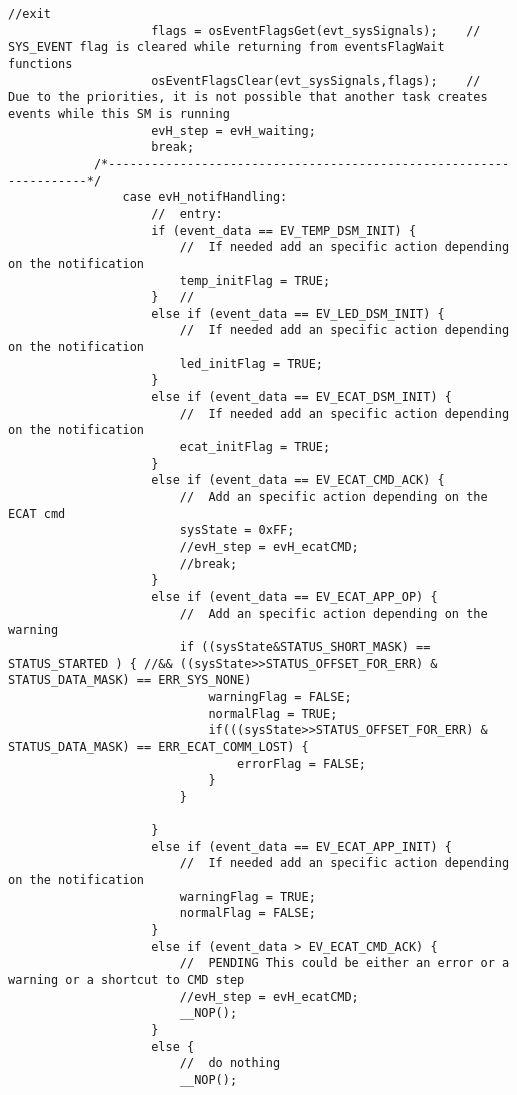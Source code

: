 \begin{lstlisting}[label=lst:event,caption={Main source code for Event Handler DSM.}]
                    //exit
                    flags = osEventFlagsGet(evt_sysSignals);	//	SYS_EVENT flag is cleared while returning from eventsFlagWait functions
                    osEventFlagsClear(evt_sysSignals,flags);	//	Due to the priorities, it is not possible that another task creates events while this SM is running
                    evH_step = evH_waiting;
                    break;
            /*-------------------------------------------------------------------*/
                case evH_notifHandling:
                    //	entry:
                    if (event_data == EV_TEMP_DSM_INIT) {
                        //	If needed add an specific action depending on the notification
                        temp_initFlag = TRUE;
                    }	//
                    else if (event_data == EV_LED_DSM_INIT) {
                        //	If needed add an specific action depending on the notification
                        led_initFlag = TRUE;
                    }
                    else if (event_data == EV_ECAT_DSM_INIT) {
                        //	If needed add an specific action depending on the notification
                        ecat_initFlag = TRUE;
                    }
                    else if (event_data == EV_ECAT_CMD_ACK) {
                        //	Add an specific action depending on the ECAT cmd
                        sysState = 0xFF;
                        //evH_step = evH_ecatCMD;
                        //break;
                    }
                    else if (event_data == EV_ECAT_APP_OP) {
                        //	Add an specific action depending on the warning
                        if ((sysState&STATUS_SHORT_MASK) == STATUS_STARTED ) { //&& ((sysState>>STATUS_OFFSET_FOR_ERR) & STATUS_DATA_MASK) == ERR_SYS_NONE)
                            warningFlag = FALSE;
                            normalFlag = TRUE;
                            if(((sysState>>STATUS_OFFSET_FOR_ERR) & STATUS_DATA_MASK) == ERR_ECAT_COMM_LOST) {
                                errorFlag = FALSE;
                            }
                        }
    
                    }
                    else if (event_data == EV_ECAT_APP_INIT) {
                        //	If needed add an specific action depending on the notification
                        warningFlag = TRUE;
                        normalFlag = FALSE;
                    }
                    else if (event_data > EV_ECAT_CMD_ACK) {
                        //	PENDING This could be either an error or a warning or a shortcut to CMD step
                        //evH_step = evH_ecatCMD;
                        __NOP();
                    }
                    else {
                        //	do nothing
                        __NOP();
    

\end{lstlisting}
